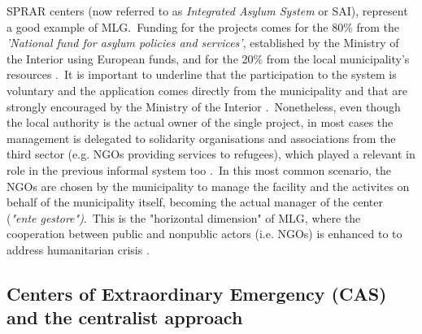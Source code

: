 \documentclass[authoryear,preprint,review,12pt]{elsarticle}
\begin{document}
\vspace{5pt}

\noindent
SPRAR centers (now referred to as \textit{Integrated Asylum System} or SAI), represent a good example of MLG.\ Funding for the projects comes for the 80\% from the \textit{'National fund for asylum policies and services'}, established by the Ministry of the Interior using European funds, and for the 20\% from the local municipality's resources \citep{anci2005}.\ It is important to underline that the participation to the system is voluntary and the application comes directly from the municipality and that are strongly encouraged by the Ministry of the Interior \citep{campomori2020}.\ Nonetheless, even though the local authority is the actual owner of the single project, in most cases the management is delegated to solidarity organisations and associations from the third sector (e.g. NGOs providing services to refugees), which played a relevant in role in the previous informal system too \citep{anci2005}.\ In this most common scenario, the NGOs are chosen by the municipality to manage the facility and the activites on behalf of the municipality itself, becoming the actual manager of the center (\textit{"ente gestore")}.\ This is the "horizontal dimension" of MLG, where the cooperation between public and nonpublic actors (i.e. NGOs) is enhanced to to address humanitarian crisis \citep{ambrosini2021}.\\

\subsection{Centers of Extraordinary Emergency (CAS) and the centralist approach}
\end{document}
